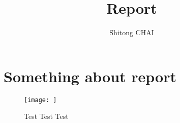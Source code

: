 \documentclass[a4paper]{report}
\title{Report}
\date{}
\author{Shitong CHAI}
\begin{document}
\maketitle
\tableofcontents

\chapter {Something about report\cite{Nobody06}}

\begin{figure}[H]
\centering
\texttt{[image: ]}
\caption{Test Test Test}
\end{figure}


{}

\end{document}
